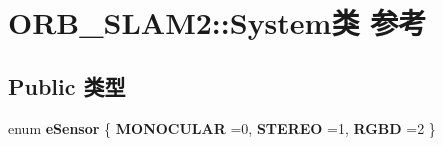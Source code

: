 \hypertarget{classORB__SLAM2_1_1System}{\section{O\-R\-B\-\_\-\-S\-L\-A\-M2\-:\-:System类 参考}
\label{classORB__SLAM2_1_1System}
}
\subsection*{Public 类型}
\begin{DoxyCompactItemize}
\item 
enum {\bfseries e\-Sensor} \{ {\bfseries M\-O\-N\-O\-C\-U\-L\-A\-R} =0, 
{\bfseries S\-T\-E\-R\-E\-O} =1, 
{\bfseries R\-G\-B\-D} =2
 \}
\end{DoxyCompactItemize}
